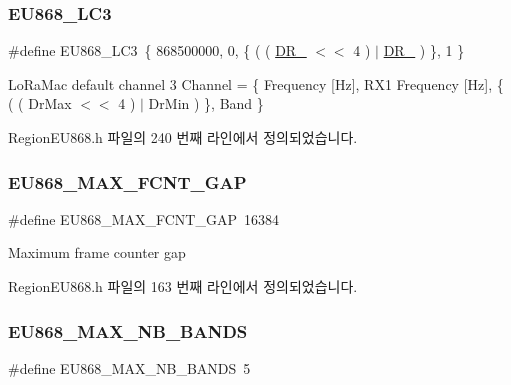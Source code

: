 \subsubsection{\texorpdfstring{E\+U868\+\_\+\+L\+C3}{EU868\_LC3}}
{\footnotesize\ttfamily \#define E\+U868\+\_\+\+L\+C3~\{ 868500000, 0, \{ ( ( \mbox{\hyperlink{group___r_e_g_i_o_n_ga872e12c82020c02a7f70a1c6ed1375df}{D\+R\+\_}} $<$$<$ 4 ) $\vert$ \mbox{\hyperlink{group___r_e_g_i_o_n_ga6c4ef966b4f3d5eb7597b087f2b97095}{D\+R\+\_}} ) \}, 1 \}}

Lo\+Ra\+Mac default channel 3 Channel = \{ Frequency \mbox{[}Hz\mbox{]}, R\+X1 Frequency \mbox{[}Hz\mbox{]}, \{ ( ( Dr\+Max $<$$<$ 4 ) $\vert$ Dr\+Min ) \}, Band \} 

Region\+E\+U868.\+h 파일의 240 번째 라인에서 정의되었습니다.

\mbox{\label{group___r_e_g_i_o_n_e_u868_ga82b9bba1cf3046bb808448af3a3851a6}} 
\subsubsection{\texorpdfstring{E\+U868\+\_\+\+M\+A\+X\+\_\+\+F\+C\+N\+T\+\_\+\+G\+AP}{EU868\_MAX\_FCNT\_GAP}}
{\footnotesize\ttfamily \#define E\+U868\+\_\+\+M\+A\+X\+\_\+\+F\+C\+N\+T\+\_\+\+G\+AP~16384}

Maximum frame counter gap 

Region\+E\+U868.\+h 파일의 163 번째 라인에서 정의되었습니다.

\mbox{\label{group___r_e_g_i_o_n_e_u868_gac5749114ab11499796ef455491fe8997}} 
\subsubsection{\texorpdfstring{E\+U868\+\_\+\+M\+A\+X\+\_\+\+N\+B\+\_\+\+B\+A\+N\+DS}{EU868\_MAX\_NB\_BANDS}}
{\footnotesize\ttfamily \#define E\+U868\+\_\+\+M\+A\+X\+\_\+\+N\+B\+\_\+\+B\+A\+N\+DS~5}

